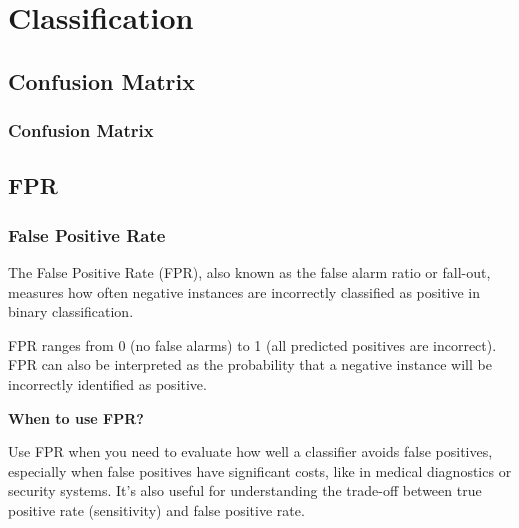 \chapter{Classification}

\thispagestyle{customstyle}
\section{Confusion Matrix}
\subsection{Confusion Matrix}

\clearpage
\section{FPR}
\subsection{False Positive Rate}
\thispagestyle{classificationstyle}

The False Positive Rate (FPR), also known as the false alarm ratio or fall-out, measures how often negative instances are incorrectly classified as positive in binary classification.

\begin{center}
\end{center}

FPR ranges from 0 (no false alarms) to 1 (all predicted positives are incorrect). FPR can also be interpreted as the probability that a negative instance will be incorrectly identified as positive.

\textbf{When to use FPR?}

Use FPR when you need to evaluate how well a classifier avoids false positives, especially when false positives have significant costs, like in medical diagnostics or security systems. It's also useful for understanding the trade-off between true positive rate (sensitivity) and false positive rate.


